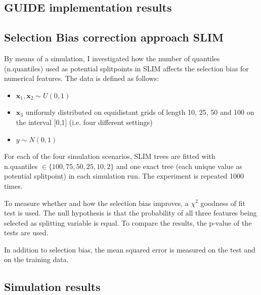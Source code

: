 \subsection{GUIDE implementation results}

\subsection{Selection Bias correction approach SLIM}

By means of a simulation, I investigated how the number of quantiles (n.quantiles) used as potential splitpoints in SLIM affects the selection bias for numerical features. 
The data is defined as follows:
\begin{itemize}
    \item $\textbf{x}_1, \textbf{x}_2 \sim U(0,1)$
    \item $\textbf{x}_3$ uniformly distributed on equidistant grids of length 10, 25, 50 and 100 on the interval [0,1] (i.e. four different settings)
    \item $y \sim N(0,1)$
\end{itemize}

For each of the four simulation scenarios, SLIM trees are fitted  with  \\ n.quantiles $\in \{100, 75, 50, 25, 10, 2\}$ and one exact tree (each unique value as potential splitpoint) in each simulation run. The experiment is repeated 1000 times.

To measure whether and how the selection bias improves, a $\chi^2$ goodness of fit test is used. The null hypothesis is that the probability of all three features being selected as splitting variable is equal. To compare the results, the p-value of the tests are used.

In addition to selection bias, the mean squared error is measured on the test and on the training data.





\subsection{Simulation results}
